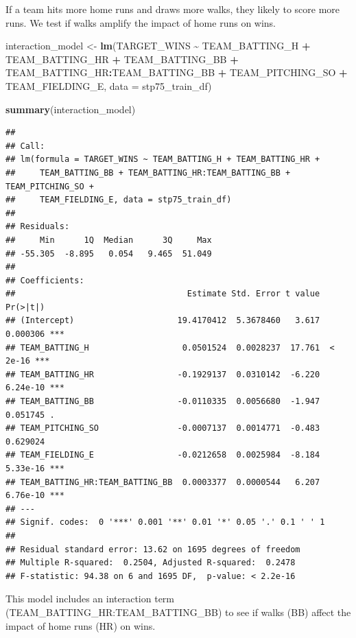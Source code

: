 \documentclass[
]{article}
\newenvironment{Shaded}{\begin{snugshade}}{\end{snugshade}}
\newcommand{\AttributeTok}[1]{\textcolor[rgb]{0.13,0.29,0.53}{#1}}
\newcommand{\FunctionTok}[1]{\textcolor[rgb]{0.13,0.29,0.53}{\textbf{#1}}}
\newcommand{\NormalTok}[1]{#1}
\newcommand{\OtherTok}[1]{\textcolor[rgb]{0.56,0.35,0.01}{#1}}
\newcommand{\SpecialCharTok}[1]{\textcolor[rgb]{0.81,0.36,0.00}{\textbf{#1}}}
\begin{document}
If a team hits more home runs and draws more walks, they likely to score
more runs. We test if walks amplify the impact of home runs on wins.

\begin{Shaded}
\begin{Highlighting}[]
\NormalTok{interaction\_model }\OtherTok{\textless{}{-}} \FunctionTok{lm}\NormalTok{(TARGET\_WINS }\SpecialCharTok{\textasciitilde{}}\NormalTok{ TEAM\_BATTING\_H }\SpecialCharTok{+}\NormalTok{ TEAM\_BATTING\_HR }\SpecialCharTok{+}\NormalTok{ TEAM\_BATTING\_BB }\SpecialCharTok{+} 
\NormalTok{                          TEAM\_BATTING\_HR}\SpecialCharTok{:}\NormalTok{TEAM\_BATTING\_BB }\SpecialCharTok{+} 
\NormalTok{                          TEAM\_PITCHING\_SO }\SpecialCharTok{+}\NormalTok{ TEAM\_FIELDING\_E, }
                        \AttributeTok{data =}\NormalTok{ stp75\_train\_df)}

\FunctionTok{summary}\NormalTok{(interaction\_model)}
\end{Highlighting}
\end{Shaded}

\begin{verbatim}
## 
## Call:
## lm(formula = TARGET_WINS ~ TEAM_BATTING_H + TEAM_BATTING_HR + 
##     TEAM_BATTING_BB + TEAM_BATTING_HR:TEAM_BATTING_BB + TEAM_PITCHING_SO + 
##     TEAM_FIELDING_E, data = stp75_train_df)
## 
## Residuals:
##     Min      1Q  Median      3Q     Max 
## -55.305  -8.895   0.054   9.465  51.049 
## 
## Coefficients:
##                                   Estimate Std. Error t value Pr(>|t|)    
## (Intercept)                     19.4170412  5.3678460   3.617 0.000306 ***
## TEAM_BATTING_H                   0.0501524  0.0028237  17.761  < 2e-16 ***
## TEAM_BATTING_HR                 -0.1929137  0.0310142  -6.220 6.24e-10 ***
## TEAM_BATTING_BB                 -0.0110335  0.0056680  -1.947 0.051745 .  
## TEAM_PITCHING_SO                -0.0007137  0.0014771  -0.483 0.629024    
## TEAM_FIELDING_E                 -0.0212658  0.0025984  -8.184 5.33e-16 ***
## TEAM_BATTING_HR:TEAM_BATTING_BB  0.0003377  0.0000544   6.207 6.76e-10 ***
## ---
## Signif. codes:  0 '***' 0.001 '**' 0.01 '*' 0.05 '.' 0.1 ' ' 1
## 
## Residual standard error: 13.62 on 1695 degrees of freedom
## Multiple R-squared:  0.2504, Adjusted R-squared:  0.2478 
## F-statistic: 94.38 on 6 and 1695 DF,  p-value: < 2.2e-16
\end{verbatim}

This model includes an interaction term
(TEAM\_BATTING\_HR:TEAM\_BATTING\_BB) to see if walks (BB) affect the
impact of home runs (HR) on wins.
\end{document}
